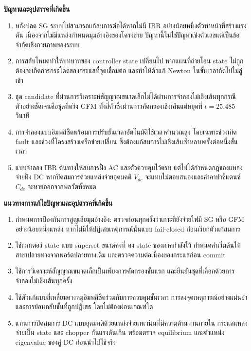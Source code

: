 \documentclass[12pt,a4paper]{article}
\newcommand{\templateheading}[1]{%
  \par\addvspace{0.85em}\noindent
  {\fontsize{19}{21}\selectfont\bfseries #1}\par
  \vspace{0.10em}\noindent{\color{academicblue}\rule{\textwidth}{0.9pt}}\par
  \vspace{0.30em}}
\begin{document}
\templateheading{ปัญหาและอุปสรรคที่เกิดขึ้น}
\begin{enumerate}
\item หลังปลด SG ระบบไม่สามารถแก้สมการต่อได้หากไม่มี IBR อย่างน้อยหนึ่งตัวทำหน้าที่สร้างแรงดัน เนื่องจากไม่มีแหล่งกำหนดมุมอ้างอิงของโครงข่าย ปัญหานี้ไม่ใช่ปัญหาเชิงตัวเลขแต่เป็นข้อจำกัดเชิงกายภาพของระบบ
\item การสลับโหมดทำให้บทบาทของ controller state เปลี่ยนไป หากแผนที่ถ่ายโอน state ไม่ถูกต้องจะเกิดการกระโดดของกระแสที่จุดเชื่อมต่อ และทำให้ตัวแก้ Newton ในขั้นเวลาถัดไปไม่ลู่เข้า
\item ชุด candidate ที่ผ่านการวิเคราะห์สัญญาณขนาดเล็กไม่ได้ผ่านการจำลองไม่เชิงเส้นทุกกรณี ตัวอย่างชัดเจนคือชุดที่ตรึง GFM ทั้งสี่ตัวซึ่งผ่านการคัดกรองเชิงเส้นแต่หยุดที่ $t=25.485$ วินาที
\item การจำลองแบบอิมพลิซิตพร้อมการปรับขั้นเวลาอัตโนมัติใช้เวลาคำนวณสูง โดยเฉพาะช่วงเกิด fault และช่วงที่โครงสร้างเครือข่ายเปลี่ยน ซึ่งต้องแก้สมการไม่เชิงเส้นซ้ำหลายครั้งต่อหนึ่งขั้นเวลา
\item แบบจำลอง IBR ต้นทางให้สมการฝั่ง AC และตัวควบคุมไว้ครบ แต่ไม่ได้กำหนดกฎของแหล่งจ่ายฝั่ง DC หากปิดสมการด้วยแหล่งจ่ายอุดมคติ $V_{dc}$ จะแทบไม่ตอบสนองและค่าคาปาซิแตนซ์ $C_{dc}$ จะหายออกจากพลวัตทั้งหมด
\end{enumerate}
\newpage
\templateheading{แนวทางการแก้ไขปัญหาและอุปสรรคที่เกิดขึ้น}
\begin{enumerate}
\item กำหนดการป้องกันการสูญเสียมุมอ้างอิง: ตรวจก่อนทุกครั้งว่าเกาะที่ยังจ่ายไฟมี SG หรือ GFM อย่างน้อยหนึ่งแหล่ง หากไม่มีให้ปฏิเสธเหตุการณ์นั้นแบบ fail-closed ก่อนเรียกตัวแก้สมการ
\item ใช้เวกเตอร์ state แบบ superset ขนาดคงที่ คง state ของภาคกำลังไว้ กำหนดค่าเริ่มต้นให้สาขาปลายทางจากพอร์ตปลายทางเดิม และตรวจความต่อเนื่องของกระแสก่อน commit
\item ใช้การวิเคราะห์สัญญาณขนาดเล็กเป็นเพียงการคัดกรองขั้นแรก และยืนยันชุดที่เลือกด้วยการจำลองไม่เชิงเส้นทุกครั้ง
\item ใช้ตัวแก้แบบสี่เหลี่ยมคางหมูอิมพลิซิตร่วมกับการควบคุมขั้นเวลา การลงจุดเหตุการณ์อย่างแม่นยำ และการย้อนกลับขั้นที่ถูกปฏิเสธ โดยไม่ต้องผ่อนเกณฑ์ใด
\item แทนการปิดสมการ DC แบบอุดมคติด้วยแหล่งจ่ายเทเวนินที่มีความต้านทานภายใน กระแสแหล่งจ่ายเป็น state และ chopper กันแรงดันเกิน พร้อมตรวจ equilibrium และตำแหน่ง eigenvalue ของคู่ DC ก่อนนำไปใช้จริง
\end{enumerate}
\end{document}
